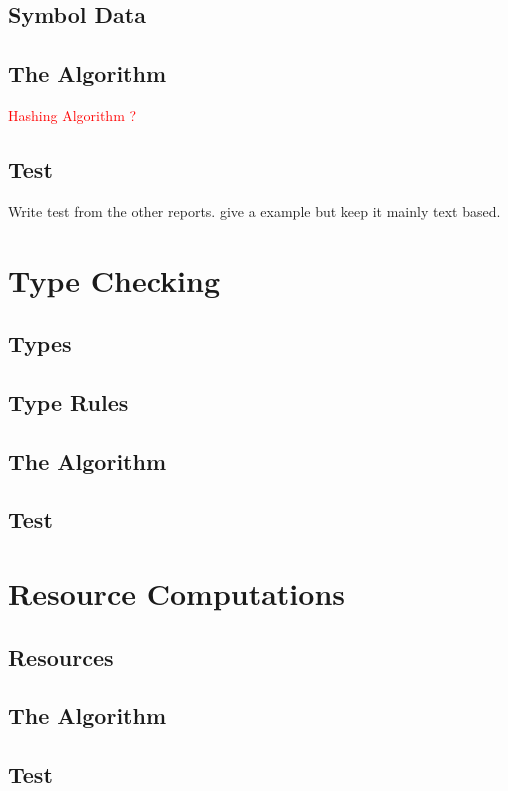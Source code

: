\documentclass{article}
\begin{document}
\subsection{Symbol Data}

\subsection{The Algorithm}
\textcolor{red}{Hashing Algorithm ?}

\subsection{Test}
Write test from the other reports. give a example but keep it mainly text based.

\section{Type Checking}

\subsection{Types}

\subsection{Type Rules}

\subsection{The Algorithm}

\subsection{Test}

\section{Resource Computations}

\subsection{Resources}

\subsection{The Algorithm}

\subsection{Test}
\end{document}
